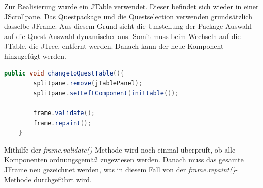 Zur Realisierung wurde ein JTable verwendet. Dieser befindet sich wieder in einer JScrollpane. Das Questpackage und die Questselection verwenden grundsätzlich dasselbe JFrame. Aus diesem Grund sieht die Umstellung der Package Auswahl auf die Quest Auswahl dynamischer aus. Somit muss beim Wechseln auf die JTable, die JTree, entfernt werden. Danach kann der neue Komponent hinzugefügt werden.
\begin{lstlisting}[language=JAVA]
	public void changetoQuestTable(){
		splitpane.remove(jTablePanel);
		splitpane.setLeftComponent(inittable());

		frame.validate();
		frame.repaint();
	}
\end{lstlisting}

Mithilfe der \textit{frame.validate()} Methode wird noch einmal überprüft, ob alle Komponenten ordnungsgemäß zugewiesen werden. Danach muss das gesamte JFrame neu gezeichnet werden, was in diesem Fall von der \textit{frame.repaint()}-Methode durchgeführt wird.